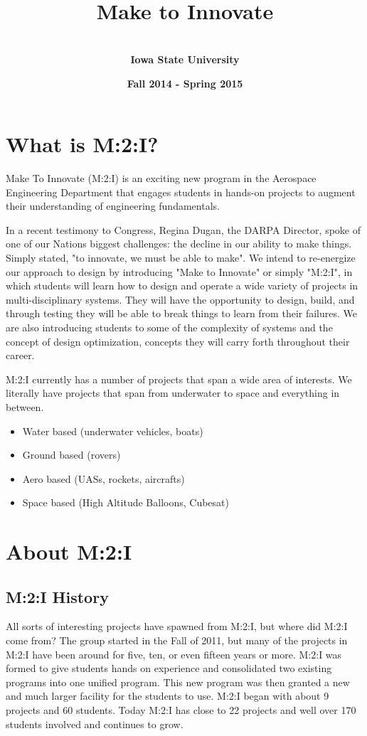 \documentclass[10pt,foldmark,notumble]{leaflet}
\title{\bf \ \\ Make to Innovate}
\author{%
\Large \bf \ \\ Iowa State University
}
\date{\bf Fall 2014 - Spring 2015}
\begin{document}
\maketitle
\section{What is M:2:I?} Make To Innovate (M:2:I) is an exciting new program in the Aerospace Engineering Department that engages students in hands-on projects to augment their understanding of engineering fundamentals.  

In a recent testimony to Congress, Regina Dugan, the DARPA Director, spoke of one of our Nations biggest challenges: the decline in our ability to make things.  Simply stated, "to innovate, we must be able to make".  We intend to re-energize our approach to design by introducing "Make to Innovate" or simply "M:2:I", in which students will learn how to design and operate a wide variety of projects in multi-disciplinary systems.  They will have the opportunity to design, build, and through testing they will be able to break things to learn from their failures.  We are also introducing students to some of the complexity of systems and the concept of design optimization, concepts they will carry forth throughout their career.

M:2:I currently has a number of projects that span a wide area of interests.  We literally have projects that span from underwater to space and everything in between.  
\begin{itemize}
\item Water based (underwater vehicles, boats)
\item Ground based (rovers)
\item Aero based (UASs, rockets, aircrafts)
\item Space based (High Altitude Balloons, Cubesat)
\end{itemize}

\section{About M:2:I}

\subsection{M:2:I History}
All sorts of interesting projects have spawned from M:2:I, but where did M:2:I come from? The group started in the Fall of 2011, but many of the projects in M:2:I have been around for five, ten, or even fifteen years or more. M:2:I was formed to give students hands on experience and consolidated two existing programs into one unified program.  This new program was then granted a new and much larger facility for the students to use.  M:2:I began with about 9 projects and 60 students.  Today M:2:I has close to 22 projects and well over 170 students involved and continues to grow.
\end{document}
